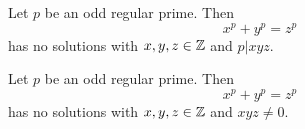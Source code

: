 \begin{theorem}\label{theorem:FLT_case_two}
	\leanok
	Let $p$ be an odd regular prime. Then \[x^p+y^p=z^p\] has no solutions with $x,y,z \in \mathbb{Z}$ and $p | xyz$.
\end{theorem}


\begin{theorem}\label{FLT_regular}
	\leanok
	Let $p$ be an odd regular prime.  Then \[x^p+y^p=z^p\] has no solutions with $x,y,z \in \mathbb{Z}$ and $xyz \ne 0$.
\end{theorem}
